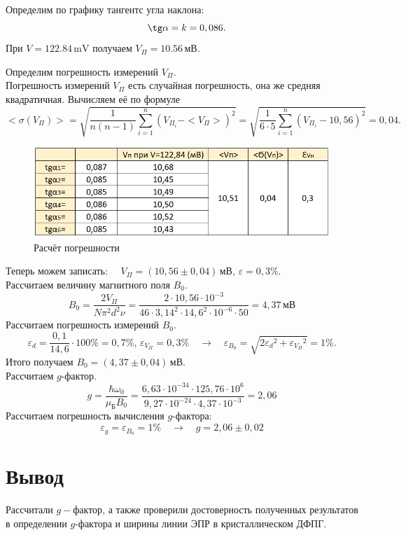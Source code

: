 \documentclass[a4paper,12pt]{article}
\begin{document}
Определим по графику тангентс угла наклона:
\begin{equation*}
    \quad\tg\alpha=k=0,086.
\end{equation*}
При $V = 122.84\,\mathrm{mV}$ получаем $V_\Pi = 10.56 \,\text{мВ}$.

Определим погрешность измерений $V_\Pi$.\\
Погрешность измерений $V_\Pi$ есть случайная погрешность, она же средняя квадратичная.
Вычисляем её по формуле
\begin{equation*}
    <\sigma(V_\Pi)>=\sqrt{\frac{1}{n(n-1)}\sum\limits_{i=1}^n(V_{\Pi_i}-<V_\Pi>)^2}=\sqrt{\frac{1}{6\cdot5}\sum\limits_{i=1}^n(V_{\Pi_i}-10,56)^2}=0,04.
\end{equation*}
\begin{figure}[h!]
    \begin{center}
        \begin{minipage}{0.75\linewidth}
            \centering
            \includegraphics[width=\linewidth]{2020-10-12.jpg}
            \caption{Расчёт погрешности}
        \end{minipage}
    \end{center}
\end{figure}

Теперь можем записать: $\quad V_\Pi=(10,56\pm0,04) \,\text{мВ}, \, \varepsilon=0,3\%$.\\
Рассчитаем величину магнитного поля $B_0$.
\begin{equation*}
    B_0=\frac{2V_\Pi}{N\pi^2d^2\nu}=\frac{2\cdot10,56\cdot10^{-3}}{46\cdot3,14^2\cdot14,6^2\cdot10^{-6}\cdot50}=4,37 \,\text{мВ}
\end{equation*}
Рассчитаем погрешность измерений $B_0$.
\begin{equation*}
    \varepsilon_d=\frac{0,1}{14,6}\cdot100\%=0,7\%,\,\varepsilon_{V_\Pi}=0,3\%\quad\rightarrow\quad \varepsilon_{B_0}=\sqrt{2{\varepsilon_d}^2+{\varepsilon_{V_\Pi}}^2}=1\%.
\end{equation*}
Итого получаем $B_0=(4,37\pm0,04)\,\text{мВ}$.\\

Рассчитаем $g$-фактор.
\begin{equation*}
    g=\frac{\hbar\omega_0}{\mu_\text{Б}B_0}=\frac{6,63\cdot10^{-34}\cdot125,76\cdot10^6}{9,27\cdot10^{-24}\cdot4,37\cdot10^{-3}}=2,06
\end{equation*}
Рассчитаем погрешность вычисления $g$-фактора:
\begin{equation*}
    \varepsilon_g=\varepsilon_{B_0}=1\%\quad\rightarrow\quad g=2,06\pm0,02
\end{equation*}
\section{Вывод}

Рассчитали $g-$фактор, а также проверили достоверность полученных результатов в определении
$g$-фактора и ширины линии ЭПР в кристаллическом ДФПГ.
    
\end{document}
